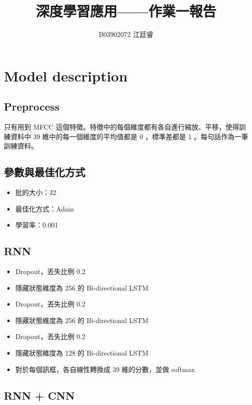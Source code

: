 \documentclass[fleqn,a4paper,12pt]{article}
\title{深度學習應用——作業一報告}
\author{B03902072 江廷睿}
\date{}
\begin{document}
\maketitle
\thispagestyle{fancy}

\section{Model description}
\label{sec:model}

\subsection{Preprocess}

只有用到 MFCC 這個特徵。特徵中的每個維度都有各自進行縮放、平移，使得訓練資料中 39 維中的每一個維度的平均值都是 0 ，標準差都是 1 。每句話作為一筆訓練資料。

\subsection{參數與最佳化方式}

\begin{itemize}
\item 批的大小：32
\item 最佳化方式：Adam
\item 學習率：0.001
\end{itemize}


\subsection{RNN}

\begin{itemize}
\item Dropout，丟失比例 0.2
\item 隱藏狀態維度為 256 的 Bi-directional LSTM
\item Dropout，丟失比例 0.2
\item 隱藏狀態維度為 256 的 Bi-directional LSTM
\item Dropout，丟失比例 0.2
\item 隱藏狀態維度為 128 的 Bi-directional LSTM
\item 對於每個訊框，各自線性轉換成 39 維的分數，並做 softmax 
\end{itemize}

\subsection{RNN + CNN}
\end{document}
